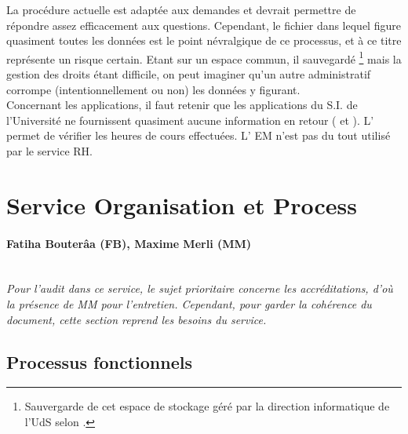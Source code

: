 \documentclass{book}
\begin{document}
La procédure actuelle est adaptée aux demandes et devrait permettre de 
répondre assez efficacement aux questions. Cependant, le fichier 
dans lequel figure quasiment toutes les données est le point névralgique
de ce processus, et à ce titre représente un risque certain. Etant sur
un espace commun, il sauvegardé%
\footnote{Sauvergarde de cet espace de stockage géré par la direction 
informatique de l'UdS selon \CK.
}
mais la gestion des droits étant difficile, on peut imaginer qu'un autre 
administratif corrompe (intentionnellement ou non) les données y figurant.\\

Concernant les applications, il faut retenir que les applications
du S.I. de l'Université ne fournissent quasiment aucune information en
retour ( et ). L' permet de 
vérifier les heures de cours effectuées. L' EM n'est pas 
du tout utilisé par le service RH.
 



\section{Service Organisation et Process}

\paragraph{Fatiha Bouterâa (FB), Maxime Merli (MM)} 
~\\

\textit{Pour l'audit dans ce service, le sujet prioritaire concerne les 
accréditations, d'où la présence de MM pour l'entretien. Cependant, pour 
garder la cohérence du document, cette section reprend les besoins du service.}

\subsection{Processus fonctionnels}
\label{sc:sop-process}
\end{document}
